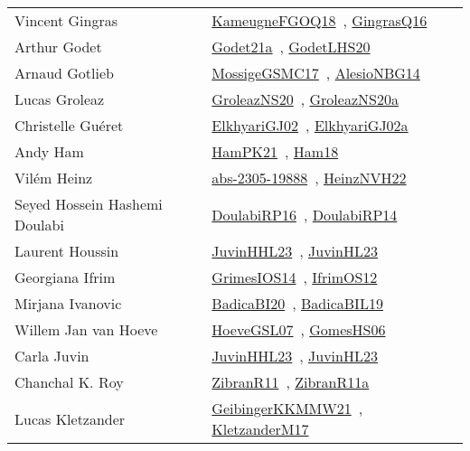 {\begin{longtable}{p{4cm}p{20cm}}
Vincent Gingras & \href{works/KameugneFGOQ18.pdf}{KameugneFGOQ18}~\cite{KameugneFGOQ18}, \href{works/GingrasQ16.pdf}{GingrasQ16}~\cite{GingrasQ16}\\
Arthur Godet & \href{}{Godet21a}~\cite{Godet21a}, \href{works/GodetLHS20.pdf}{GodetLHS20}~\cite{GodetLHS20}\\
Arnaud Gotlieb & \href{works/MossigeGSMC17.pdf}{MossigeGSMC17}~\cite{MossigeGSMC17}, \href{works/AlesioNBG14.pdf}{AlesioNBG14}~\cite{AlesioNBG14}\\
Lucas Groleaz & \href{works/GroleazNS20.pdf}{GroleazNS20}~\cite{GroleazNS20}, \href{works/GroleazNS20a.pdf}{GroleazNS20a}~\cite{GroleazNS20a}\\
Christelle Gu{\'{e}}ret & \href{works/ElkhyariGJ02.pdf}{ElkhyariGJ02}~\cite{ElkhyariGJ02}, \href{works/ElkhyariGJ02a.pdf}{ElkhyariGJ02a}~\cite{ElkhyariGJ02a}\\
Andy Ham & \href{works/HamPK21.pdf}{HamPK21}~\cite{HamPK21}, \href{works/Ham18.pdf}{Ham18}~\cite{Ham18}\\
Vil{\'{e}}m Heinz & \href{works/abs-2305-19888.pdf}{abs-2305-19888}~\cite{abs-2305-19888}, \href{works/HeinzNVH22.pdf}{HeinzNVH22}~\cite{HeinzNVH22}\\
Seyed Hossein Hashemi Doulabi & \href{works/DoulabiRP16.pdf}{DoulabiRP16}~\cite{DoulabiRP16}, \href{works/DoulabiRP14.pdf}{DoulabiRP14}~\cite{DoulabiRP14}\\
Laurent Houssin & \href{works/JuvinHHL23.pdf}{JuvinHHL23}~\cite{JuvinHHL23}, \href{works/JuvinHL23.pdf}{JuvinHL23}~\cite{JuvinHL23}\\
Georgiana Ifrim & \href{works/GrimesIOS14.pdf}{GrimesIOS14}~\cite{GrimesIOS14}, \href{works/IfrimOS12.pdf}{IfrimOS12}~\cite{IfrimOS12}\\
Mirjana Ivanovic & \href{works/BadicaBI20.pdf}{BadicaBI20}~\cite{BadicaBI20}, \href{works/BadicaBIL19.pdf}{BadicaBIL19}~\cite{BadicaBIL19}\\
Willem Jan van Hoeve & \href{works/HoeveGSL07.pdf}{HoeveGSL07}~\cite{HoeveGSL07}, \href{works/GomesHS06.pdf}{GomesHS06}~\cite{GomesHS06}\\
Carla Juvin & \href{works/JuvinHHL23.pdf}{JuvinHHL23}~\cite{JuvinHHL23}, \href{works/JuvinHL23.pdf}{JuvinHL23}~\cite{JuvinHL23}\\
Chanchal K. Roy & \href{works/ZibranR11.pdf}{ZibranR11}~\cite{ZibranR11}, \href{works/ZibranR11a.pdf}{ZibranR11a}~\cite{ZibranR11a}\\
Lucas Kletzander & \href{works/GeibingerKKMMW21.pdf}{GeibingerKKMMW21}~\cite{GeibingerKKMMW21}, \href{works/KletzanderM17.pdf}{KletzanderM17}~\cite{KletzanderM17}\\

\end{longtable}}
